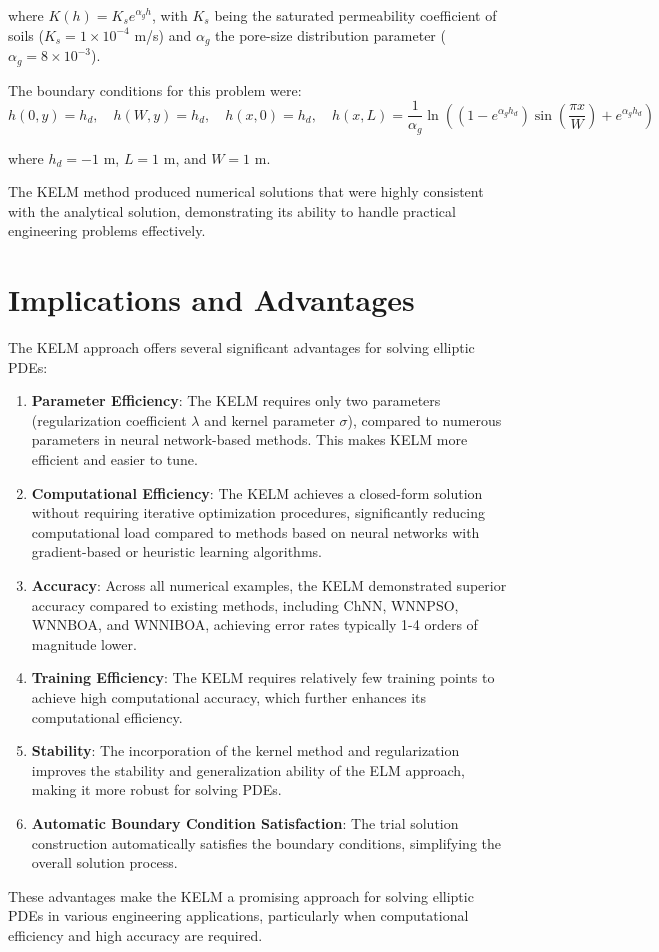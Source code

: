 \documentclass[11pt,a4paper]{article}
\begin{document}
where $K(h) = K_s e^{\alpha_g h}$, with $K_s$ being the saturated permeability coefficient of soils ($K_s = 1 \times 10^{-4}$ m/s) and $\alpha_g$ the pore-size distribution parameter ($\alpha_g = 8 \times 10^{-3}$).

The boundary conditions for this problem were:
\begin{equation}
h(0,y) = h_d, \quad h(W,y) = h_d, \quad h(x,0) = h_d, \quad h(x,L) = \frac{1}{\alpha_g}\ln\left((1-e^{\alpha_g h_d})\sin\left(\frac{\pi x}{W}\right) + e^{\alpha_g h_d}\right)
\end{equation}

where $h_d = -1$ m, $L = 1$ m, and $W = 1$ m.

The KELM method produced numerical solutions that were highly consistent with the analytical solution, demonstrating its ability to handle practical engineering problems effectively.

\section{Implications and Advantages}

The KELM approach offers several significant advantages for solving elliptic PDEs:

\begin{enumerate}
    \item \textbf{Parameter Efficiency}: The KELM requires only two parameters (regularization coefficient $\lambda$ and kernel parameter $\sigma$), compared to numerous parameters in neural network-based methods. This makes KELM more efficient and easier to tune.
    
    \item \textbf{Computational Efficiency}: The KELM achieves a closed-form solution without requiring iterative optimization procedures, significantly reducing computational load compared to methods based on neural networks with gradient-based or heuristic learning algorithms.
    
    \item \textbf{Accuracy}: Across all numerical examples, the KELM demonstrated superior accuracy compared to existing methods, including ChNN, WNNPSO, WNNBOA, and WNNIBOA, achieving error rates typically 1-4 orders of magnitude lower.
    
    \item \textbf{Training Efficiency}: The KELM requires relatively few training points to achieve high computational accuracy, which further enhances its computational efficiency.
    
    \item \textbf{Stability}: The incorporation of the kernel method and regularization improves the stability and generalization ability of the ELM approach, making it more robust for solving PDEs.
    
    \item \textbf{Automatic Boundary Condition Satisfaction}: The trial solution construction automatically satisfies the boundary conditions, simplifying the overall solution process.
\end{enumerate}

These advantages make the KELM a promising approach for solving elliptic PDEs in various engineering applications, particularly when computational efficiency and high accuracy are required.
\end{document}
